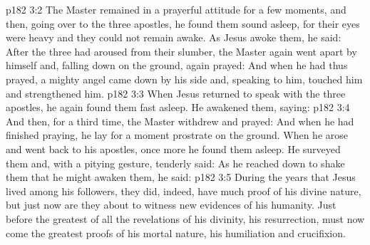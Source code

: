 \vs p182 3:2 The Master remained in a prayerful attitude for a few moments, and then, going over to the three apostles, he found them sound asleep, for their eyes were heavy and they could not remain awake. As Jesus awoke them, he said:  After the three had aroused from their slumber, the Master again went apart by himself and, falling down on the ground, again prayed:  And when he had thus prayed, a mighty angel came down by his side and, speaking to him, touched him and strengthened him.
\vs p182 3:3 When Jesus returned to speak with the three apostles, he again found them fast asleep. He awakened them, saying: 
\vs p182 3:4 And then, for a third time, the Master withdrew and prayed:  And when he had finished praying, he lay for a moment prostrate on the ground. When he arose and went back to his apostles, once more he found them asleep. He surveyed them and, with a pitying gesture, tenderly said:  As he reached down to shake them that he might awaken them, he said: 
\vs p182 3:5 \pc During the years that Jesus lived among his followers, they did, indeed, have much proof of his divine nature, but just now are they about to witness new evidences of his humanity. Just before the greatest of all the revelations of his divinity, his resurrection, must now come the greatest proofs of his mortal nature, his humiliation and crucifixion.
